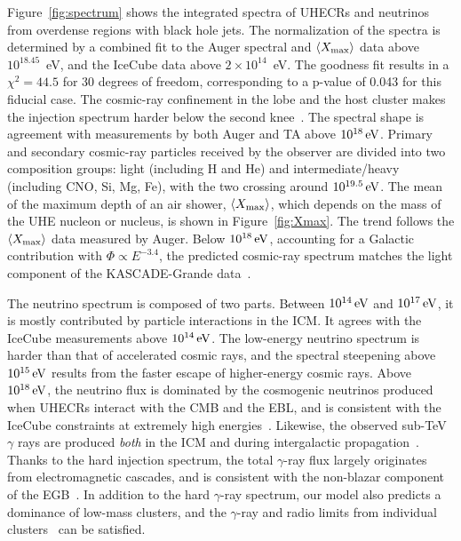 \documentclass[aps,prd,onecolumn,superscriptaddress,11pt]{revtex4}
\begin{document}
Figure~\ref{fig:spectrum} shows the integrated spectra of UHECRs and neutrinos from overdense regions with black hole jets. 
The normalization of the spectra is determined by a combined fit to the Auger spectral and $\langle X_{\rm max}\rangle$ data above $10^{18.45}$~eV, and the IceCube data above $2\times{10}^{14}$~eV. The goodness fit results in a $\chi^2=44.5$ for 30 degrees of freedom, corresponding to a p-value of 0.043 for this fiducial case. The cosmic-ray confinement in the lobe and the host cluster makes the injection spectrum harder below the second knee~\cite{Murase:2008yt,Murase:2013rfa}.
The spectral shape is agreement with measurements by both Auger and TA above $10^{18}\,\rm eV$. 
Primary and secondary cosmic-ray particles received by the observer are divided into two composition groups: light (including H and He) and intermediate/heavy (including CNO, Si, Mg, Fe), with the two crossing around $10^{19.5}\,\rm eV$. The mean of the maximum depth of an air shower, $\langle X_{\rm max}\rangle$, which depends on the mass of the UHE nucleon or nucleus, is shown in Figure~\ref{fig:Xmax}. The trend follows the $\langle X_{\rm max}\rangle$ data measured by Auger. Below $10^{18}\,\rm eV$, accounting for a Galactic contribution with $\Phi\propto E^{-3.4}$, the predicted cosmic-ray spectrum matches the light component of the KASCADE-Grande data~\cite{::2013dga}.

The neutrino spectrum is composed of two parts. 
Between $10^{14}\,\rm eV$ and $10^{17}\,\rm eV$, it is mostly contributed by particle interactions in the ICM. It agrees with the IceCube measurements above $10^{14}\,\rm eV$.  The low-energy neutrino spectrum is harder than that of accelerated cosmic rays, and the spectral steepening above $10^{15}\,\rm eV$ results from the faster escape of higher-energy cosmic rays.  Above $10^{18}\,\rm eV$, the neutrino flux is dominated by the cosmogenic neutrinos produced when UHECRs interact with the CMB and the EBL, and is consistent with the IceCube constraints at extremely high energies~\cite{2016arXiv160705886I}.  
Likewise, the observed sub-TeV $\gamma$ rays are produced {\it both} in the ICM and during intergalactic propagation~\cite{2016PhRvD..94j3006M}. Thanks to the hard injection spectrum, the total $\gamma$-ray flux largely originates from electromagnetic cascades, and is consistent with the non-blazar component of the EGB~\cite{PhysRevLett.116.151105}. In addition to the hard $\gamma$-ray spectrum, our model also predicts a dominance of low-mass clusters, and the $\gamma$-ray and radio limits from individual clusters~\cite{2015A&A...578A..32Z} can be satisfied. 
 
\end{document}
